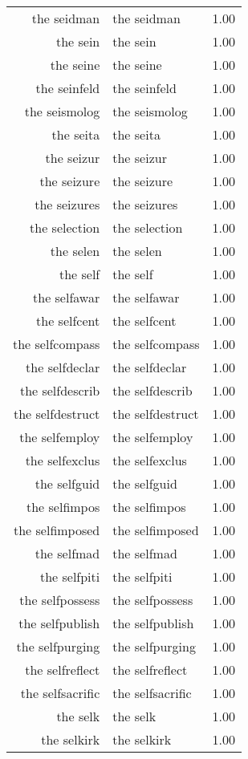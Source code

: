 \begin{table}[ht]
\begin{tabular}{rlr}
  the seidman & the seidman & 1.00 \\ 
  the sein & the sein & 1.00 \\ 
  the seine & the seine & 1.00 \\ 
  the seinfeld & the seinfeld & 1.00 \\ 
  the seismolog & the seismolog & 1.00 \\ 
  the seita & the seita & 1.00 \\ 
  the seizur & the seizur & 1.00 \\ 
  the seizure & the seizure & 1.00 \\ 
  the seizures & the seizures & 1.00 \\ 
  the selection & the selection & 1.00 \\ 
  the selen & the selen & 1.00 \\ 
  the self & the self & 1.00 \\ 
  the selfawar & the selfawar & 1.00 \\ 
  the selfcent & the selfcent & 1.00 \\ 
  the selfcompass & the selfcompass & 1.00 \\ 
  the selfdeclar & the selfdeclar & 1.00 \\ 
  the selfdescrib & the selfdescrib & 1.00 \\ 
  the selfdestruct & the selfdestruct & 1.00 \\ 
  the selfemploy & the selfemploy & 1.00 \\ 
  the selfexclus & the selfexclus & 1.00 \\ 
  the selfguid & the selfguid & 1.00 \\ 
  the selfimpos & the selfimpos & 1.00 \\ 
  the selfimposed & the selfimposed & 1.00 \\ 
  the selfmad & the selfmad & 1.00 \\ 
  the selfpiti & the selfpiti & 1.00 \\ 
  the selfpossess & the selfpossess & 1.00 \\ 
  the selfpublish & the selfpublish & 1.00 \\ 
  the selfpurging & the selfpurging & 1.00 \\ 
  the selfreflect & the selfreflect & 1.00 \\ 
  the selfsacrific & the selfsacrific & 1.00 \\ 
  the selk & the selk & 1.00 \\ 
  the selkirk & the selkirk & 1.00 \\ 

\end{tabular}
\end{table}
